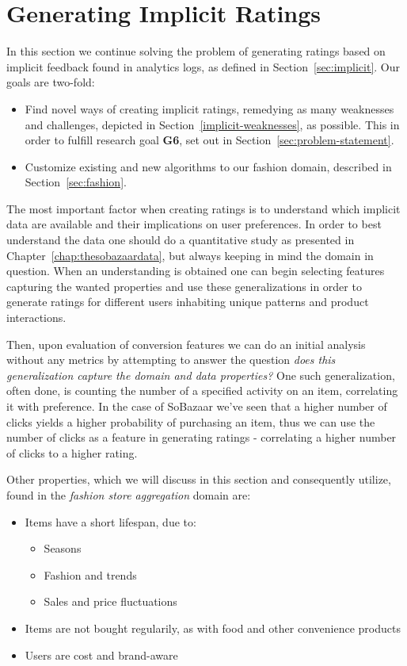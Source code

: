 \section{Generating Implicit Ratings}
\label{sec:implementation-implicit}

In this section we continue solving the problem of generating ratings based on
implicit feedback found in analytics logs, as defined in
Section~\ref{sec:implicit}. Our goals are two-fold:

\begin{itemize}
  \item Find novel ways of creating implicit ratings, remedying as many
  weaknesses and challenges, depicted in Section~\ref{implicit-weaknesses}, as
  possible. This in order to fulfill research goal \textbf{G6}, set out in
  Section~\ref{sec:problem-statement}.
  \item Customize existing and new algorithms to our fashion domain, described
  in Section~\ref{sec:fashion}.
\end{itemize}

The most important factor when creating ratings is to understand which implicit
data are available and their implications on user preferences. In order to best
understand the data one should do a quantitative study as presented in
Chapter~\ref{chap:thesobazaardata}, but always keeping in mind the domain in question.
When an understanding is obtained one can begin selecting features capturing
the wanted properties and use these generalizations in order to generate
ratings for different users inhabiting unique patterns and product
interactions.

Then, upon evaluation of conversion features we can do an initial analysis
without any metrics by attempting to answer the question \textit{does this
generalization capture the domain and data properties?}
One such generalization, often done, is counting the number of a specified
activity on an item, correlating it with preference. In the case of SoBazaar
we've seen that a higher number of clicks yields a higher probability of
purchasing an item, thus we can use the number of clicks as a feature in
generating ratings - correlating a higher number of clicks to a higher rating.

Other properties, which we will discuss in this section and consequently
utilize, found in the \textit{fashion store aggregation} domain are:

\begin{itemize}
  \item Items have a short lifespan, due to:
  \begin{itemize}
    \item Seasons
    \item Fashion and trends
    \item Sales and price fluctuations
  \end{itemize}
  \item Items are not bought regularily, as with food and other convenience
  products
  \item Users are cost and brand-aware
\end{itemize}

